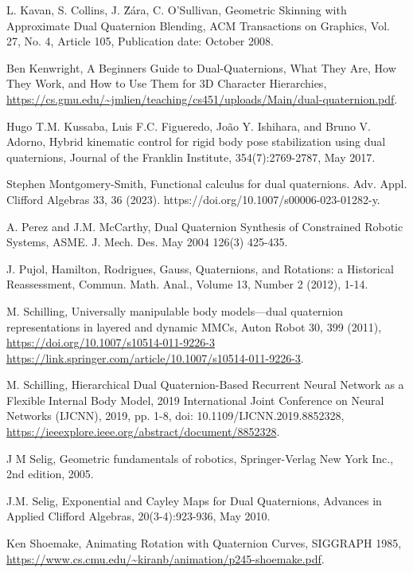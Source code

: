 \documentclass[reqno,12pt]{amsart}
\begin{document}
\begin{thebibliography}{99}
 L. Kavan, S. Collins, J. \u Z\'ara, C. O'Sullivan, Geometric Skinning with Approximate Dual Quaternion Blending, ACM Transactions on Graphics, Vol. 27, No. 4, Article 105, Publication date: October 2008.

 Ben Kenwright, A Beginners Guide to Dual-Quaternions, What They Are, How They Work, and How to Use Them for 3D Character Hierarchies, \url{https://cs.gmu.edu/~jmlien/teaching/cs451/uploads/Main/dual-quaternion.pdf}.

 Hugo T.M. Kussaba, Luis F.C. Figueredo, Jo\~ao Y. Ishihara, and Bruno V. Adorno, Hybrid kinematic control for rigid body pose stabilization using dual quaternions, Journal of the Franklin Institute, 354(7):2769-2787, May 2017.

 Stephen Montgomery-Smith, Functional calculus for dual quaternions. Adv. Appl. Clifford Algebras 33, 36 (2023). https://doi.org/10.1007/s00006-023-01282-y.

 A. Perez and J.M. McCarthy, Dual Quaternion Synthesis of Constrained Robotic Systems, ASME. J. Mech. Des. May 2004 126(3) 425-435.

 J. Pujol, Hamilton, Rodrigues, Gauss, Quaternions, and Rotations: a Historical Reassessment, Commun. Math. Anal., Volume 13, Number 2 (2012), 1-14.

  M. Schilling, Universally manipulable body models---dual quaternion representations in layered and dynamic MMCs, Auton Robot 30, 399 (2011), \url{https://doi.org/10.1007/s10514-011-9226-3 https://link.springer.com/article/10.1007/s10514-011-9226-3}.

 M. Schilling, Hierarchical Dual Quaternion-Based Recurrent Neural Network as a Flexible Internal Body Model, 2019 International Joint Conference on Neural Networks (IJCNN), 2019, pp. 1-8, doi: 10.1109/IJCNN.2019.8852328, \url{https://ieeexplore.ieee.org/abstract/document/8852328}.

 J M Selig, Geometric fundamentals of robotics, Springer-Verlag New York Inc., 2nd edition, 2005.

 J.M. Selig, Exponential and Cayley Maps for Dual Quaternions, Advances in Applied Clifford Algebras, 20(3-4):923-936, May 2010.

 Ken Shoemake, Animating Rotation with Quaternion Curves, SIGGRAPH 1985, \url{https://www.cs.cmu.edu/~kiranb/animation/p245-shoemake.pdf}.


\end{thebibliography}
\end{document}
